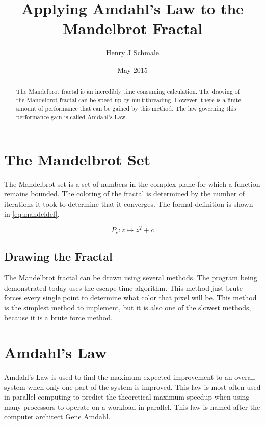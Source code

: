 \documentclass[10pt,oneside,letterpaper]{article}
\begin{document}
\title{Applying Amdahl's Law to the Mandelbrot Fractal}
\author{Henry J Schmale}
\date{May 2015}
\maketitle

\begin{abstract}
The Mandelbrot fractal is an incredibly time consuming calculation.
The drawing of the Mandelbrot fractal can be speed up by multithreading.
However, there is a finite amount of performance that can be gained by
this method. The law governing this performance gain is called Amdahl's
Law.
\end{abstract}

\section{The Mandelbrot Set}
The Mandelbrot set is a set of numbers in the complex plane for which
a function remains bounded. The coloring of the fractal is determined
by the number of iterations it took to determine that it converges.
The formal definition is shown in \eqref{eq:mandeldef}.

\begin{equation}\label{eq:mandeldef}
    P_{c}: z \mapsto z^2 + c    
\end{equation}


\subsection{Drawing the Fractal}
The Mandelbrot fractal can be drawn using several methods. The
program being demonstrated today uses the escape time algorithm.
This method just brute forces every single point to determine what color
that pixel will be. This method is the simplest method to implement, but
it is also one of the slowest methods, because it is a brute force method.

\section{Amdahl's Law}
Amdahl's Law is used to find the maximum expected improvement to an overall
system when only one part of the system is improved. This law is most often
used in parallel computing to predict the theoretical maximum speedup when
using many processors to operate on a workload in parallel. This law is named
after the computer architect Gene Amdahl.
\end{document}
